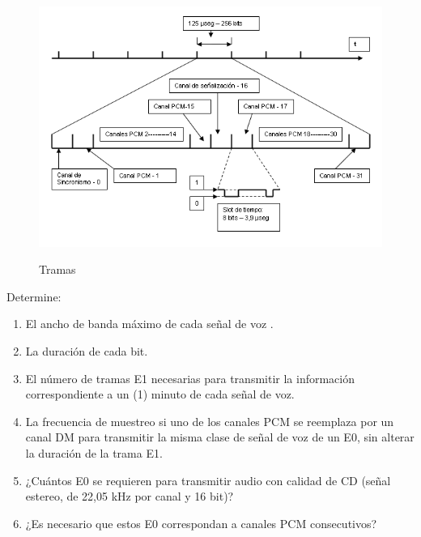 \begin{enumerate}
\begin{enumerate}

\begin{figure}[h!]
	\captionsetup{justification = raggedright, singlelinecheck = false}
	\caption{Tramas} 
	\centering
	\includegraphics[scale=0.8]{Imagenes/figtramae1.png}
	\label{fig:figtramae2}
\end{figure}

Determine: 
\begin{enumerate}
	\item El ancho de banda máximo de cada señal de voz .
	
	\item La duración de cada bit. 
	
	\item El número de tramas E1 necesarias para transmitir la información correspondiente a un (1) minuto de cada señal de voz.
	
	\item La frecuencia de muestreo si uno de los canales PCM se reemplaza por un canal DM para transmitir la misma clase de señal de voz de un E0, sin alterar la duración de la trama E1.
	
	\item ¿Cuántos E0 se requieren para transmitir audio con calidad de CD (señal estereo, de 22,05 kHz por canal y 16 bit)? 
	
	
	\item ¿Es necesario que estos E0 correspondan a canales PCM consecutivos?
	

\end{enumerate}
\end{enumerate}
\end{enumerate}
